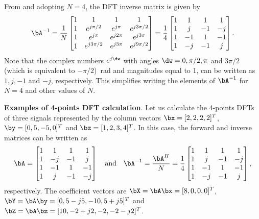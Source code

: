 From  and adopting $N=4$, the DFT inverse matrix is given by
\[ 
\bA^{-1} = \frac{1}{N}
    \begin{bmatrix}
    1 & 1 & 1 & 1\\
    1 & e^{j \pi / 2}   & e^{j \pi} &  e^{j 3\pi/2} \\
    1 & e^{j \pi}       & e^{j 2 \pi} & e^{j 3 \pi} \\
    1 & e^{j 3 \pi / 2} & e^{j 3 \pi} & e^{j 9 \pi/2} \\
    \end{bmatrix} =
					\frac{1}{4}
    \begin{bmatrix}
    1 & 1 & 1 & 1\\
    1 & j & -1 & -j \\
    1 & -1 & 1 & -1 \\
    1 & -j & -1 & j \\
    \end{bmatrix}. 		
\]
Note that the complex numbers $e^{j \dw}$ with angles $\dw=0, \pi/2, \pi$ and $3\pi/2$ (which is equivalent to $-\pi/2$)~rad and magnitudes equal to 1, can be 
written as $1, j, -1$ and $-j$, respectively. This simplifies writing the elements of $\bA^{-1}$ for $N=4$ and other values of $N$.

\bExample \textbf{Examples of 4-points DFT calculation}.
\label{ex:four_points_dft}
Let us calculate the 4-points DFTs of three signals represented by the column vectors $\bx = [2, 2, 2, 2]^T$, $\by = [0, 5, -5, 0]^T$ and $\bz = [1,2,3,4]^T$.
In this case, the forward and inverse matrices can be written as
\[ \bA = 
    \begin{bmatrix}
    1 & 1 & 1 & 1\\
    1 & -j & -1 & j \\
    1 & -1 & 1 & -1 \\
    1 & j & -1 & -j \\
    \end{bmatrix}
		\textrm{~~~and~~~}
\bA^{-1} = \frac{\bA^H}{N} = \frac{1}{4}
    \begin{bmatrix}
    1 & 1 & 1 & 1\\
    1 & j & -1 & -j \\
    1 & -1 & 1 & -1 \\
    1 & -j & -1 & j \\
    \end{bmatrix},
\]
respectively.
The coefficient vectors are $\bX = \bA \bx = [8, 0, 0, 0]^T$, $\bY = \bA \by = [0, 5-j5, -10, 5+j5]^T$ and $\bZ = \bA \bz = [10, -2+j2, -2, -2-j2]^T$.


